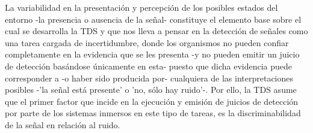  
La variabilidad en la presentación y percepción de los posibles estados del entorno -la presencia o ausencia de la señal- constituye el elemento base sobre el cual se desarrolla la TDS y que nos lleva a pensar en la detección de señales como una tarea cargada de incertidumbre, donde los organismos no pueden confiar completamente en la evidencia que se les presenta -y no pueden emitir un juicio de detección basándose únicamente en esta- puesto que dicha evidencia puede corresponder a -o haber sido producida por- cualquiera de las interpretaciones posibles -'la señal está presente' o 'no, sólo hay ruido'-. Por ello, la TDS asume que el primer factor que incide en la ejecución y emisión de juicios de detección por parte de los sistemas inmersos en este tipo de tareas, es la discriminabilidad de la señal en relación al ruido.\\



